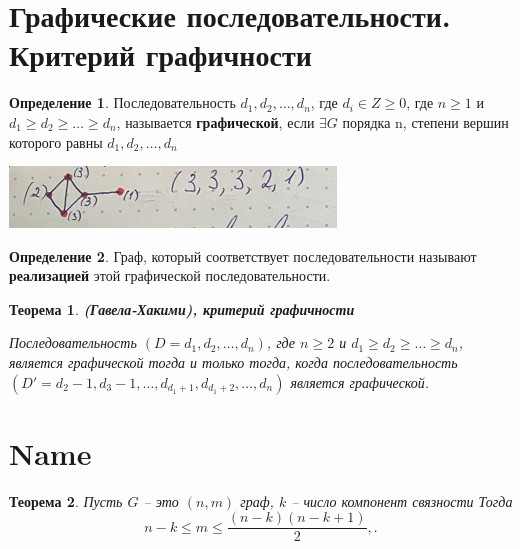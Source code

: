 \documentclass[a4paper, 12pt]{article}
\newtheorem*{theorem*}{Теорема}
\theoremstyle{definition}
\newtheorem*{definition*}{Определение}
\theoremstyle{definition}
\renewcommand{\leq}{\leqslant}
\renewcommand{\geq}{\geqslant}
\begin{document}
  \section{Графические последовательности. Критерий графичности}
  \begin{definition*}
    Последовательность $d_1,d_2,\dots,d_n$, где $d_i\in Z\geq0$, где $n\geq1$
    и $d_1\geq d_2\geq\dots\geq d_n$, называется \textbf{графической}, если $\exists G$ порядка n, степени вершин которого равны $d_1,d_2,\dots,d_n$

    \includegraphics{graphics.png}
  \end{definition*}
  \begin{definition*}
    Граф, который соответствует последовательности называют \textbf{реализацией} этой графической последовательности.
  \end{definition*}
  \begin{theorem*}
    \textbf{(Гавела-Хакими), критерий графичности}

    Последовательность $(D=d_1,d_2,\dots,d_n)$, где $n\geq2$ и $d_1\geq d_2\geq\dots\geq d_n$, является графической \textit{тогда и только тогда, когда} последовательность $(D'=d_2-1,d_3-1,\dots,d_{d_1+1},d_{d_1+2},\dots,d_n)$ является графической.
  \end{theorem*}
  \section{Name}
  \begin{theorem*}
    Пусть $G$ -- это $(n,m)$ граф, $k$ -- число компонент связности
    Тогда
    $$n-k\leq{m}\leq\frac{(n-k)(n-k+1)}{2},.$$
  \end{theorem*}
  
\end{document}
